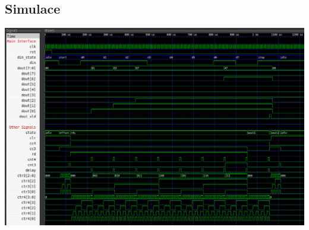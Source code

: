 \documentclass{article}
\begin{document}
\begin{landscape}
    \section{Simulace}
    \includegraphics*[scale=0.58]{assets/simulation.png}
\end{landscape}
\end{document}

